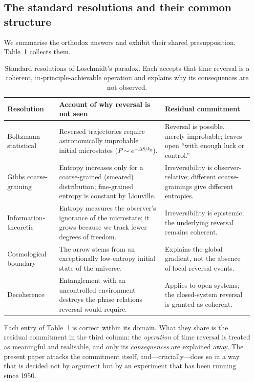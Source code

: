 \documentclass[11pt,a4paper]{article}
\theoremstyle{thmstyle}
\theoremstyle{definition}
\theoremstyle{remark}
\newcommand{\kB}{k_{\mathrm{B}}}
\begin{document}
\subsection{The standard resolutions and their common structure}
\label{sec:standard}

We summarise the orthodox answers and exhibit their shared
presupposition. Table~\ref{tab:standard} collects them.

\begin{table}[t]
\centering
\small
\caption{Standard resolutions of Loschmidt's paradox. Each accepts that
time reversal is a coherent, in-principle-achievable operation and
explains why its consequences are not observed.}
\label{tab:standard}
\begin{tabular}{p{}p{}p{}}
\toprule
\textbf{Resolution} & \textbf{Account of why reversal is not seen} &
\textbf{Residual commitment} \\
\midrule
Boltzmann statistical \citep{boltzmann1877} &
Reversed trajectories require astronomically improbable initial
microstates ($P\sim e^{-\Delta S/\kB}$). &
Reversal is possible, merely improbable; leaves open ``with enough luck
or control.'' \\
\addlinespace
Gibbs coarse-graining \citep{gibbs1902} &
Entropy increases only for a coarse-grained (smeared) distribution;
fine-grained entropy is constant by Liouville. &
Irreversibility is observer-relative; different coarse-grainings give
different entropies. \\
\addlinespace
Information-theoretic \citep{jaynes1957} &
Entropy measures the observer's ignorance of the microstate; it grows
because we track fewer degrees of freedom. &
Irreversibility is epistemic; the underlying reversal remains coherent.
\\
\addlinespace
Cosmological boundary \citep{penrose1989,penrose2004} &
The arrow stems from an exceptionally low-entropy initial state of the
universe. &
Explains the global gradient, not the absence of local reversal events.
\\
\addlinespace
Decoherence \citep{zurek2003} &
Entanglement with an uncontrolled environment destroys the phase
relations reversal would require. &
Applies to open systems; the closed-system reversal is granted as
coherent. \\
\bottomrule
\end{tabular}
\end{table}

Each entry of Table~\ref{tab:standard} is correct within its domain.
What they share is the residual commitment in the third column: the
\emph{operation} of time reversal is treated as meaningful and
realisable, and only its \emph{consequences} are explained away. The
present paper attacks the commitment itself, and---crucially---does so
in a way that is decided not by argument but by an experiment that has
been running since 1950.
\end{document}
